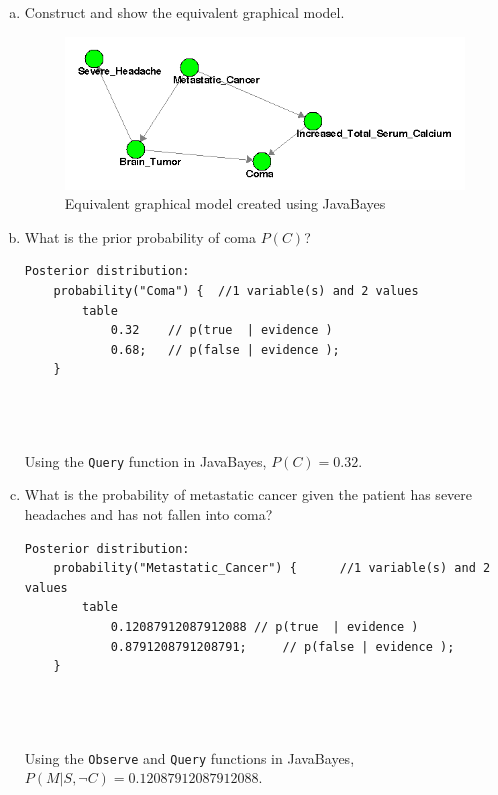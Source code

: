 \documentclass{article}
\renewcommand{\tt}{\texttt}
\begin{document}
\begin{enumerate}[a)]
\item Construct and show the equivalent graphical model.
\begin{figure}
\begin{center}
\includegraphics[scale=0.7]{part1_bn}
\caption{Equivalent graphical model created using JavaBayes}
\end{center}
\end{figure}

\item What is the prior probability of coma $P(C)$?

\begin{minipage}{\linewidth}
\begin{lstlisting}
Posterior distribution:
	probability("Coma") {  //1 variable(s) and 2 values
		table 
			0.32	// p(true  | evidence )
			0.68; 	// p(false | evidence );
	}
\end{lstlisting}
\end{minipage}\\
\\
\\
Using the \tt{Query} function in JavaBayes, $P(C) = 0.32$.

\item What is the probability of metastatic cancer given the patient has severe headaches and has not fallen into coma? 

\begin{minipage}{\linewidth}
\begin{lstlisting}
Posterior distribution:
	probability("Metastatic_Cancer") {      //1 variable(s) and 2 values
		table 
			0.12087912087912088	// p(true  | evidence )
			0.8791208791208791; 	// p(false | evidence );
	}
\end{lstlisting}
\end{minipage}\\
\\
\\
Using the \tt{Observe} and \tt{Query} functions in JavaBayes, $P(M | S, \neg C) = 0.12087912087912088$.


\end{enumerate}
\end{document}
